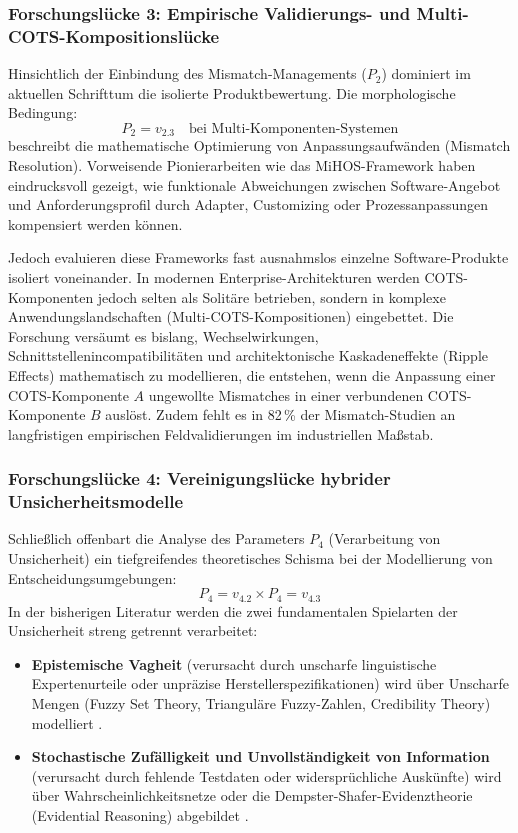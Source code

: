 \subsubsection{Forschungslücke 3: Empirische Validierungs- und Multi-COTS-Kompositionslücke}

Hinsichtlich der Einbindung des Mismatch-Managements ($P_2$) dominiert im aktuellen Schrifttum die isolierte Produktbewertung. Die morphologische Bedingung:
\begin{equation}
P_2 = v_{2.3} \quad \text{bei Multi-Komponenten-Systemen}
\end{equation}
beschreibt die mathematische Optimierung von Anpassungsaufwänden (Mismatch Resolution). Vorweisende Pionierarbeiten wie das MiHOS-Framework \cite{MC9UMXZZ, 9F79VAAB} haben eindrucksvoll gezeigt, wie funktionale Abweichungen zwischen Software-Angebot und Anforderungsprofil durch Adapter, Customizing oder Prozessanpassungen kompensiert werden können. 

Jedoch evaluieren diese Frameworks fast ausnahmslos einzelne Software-Produkte isoliert voneinander. In modernen Enterprise-Architekturen werden COTS-Komponenten jedoch selten als Solitäre betrieben, sondern in komplexe Anwendungslandschaften (Multi-COTS-Kompositionen) eingebettet. Die Forschung versäumt es bislang, Wechselwirkungen, Schnittstellenincompatibilitäten und architektonische Kaskadeneffekte (Ripple Effects) mathematisch zu modellieren, die entstehen, wenn die Anpassung einer COTS-Komponente $A$ ungewollte Mismatches in einer verbundenen COTS-Komponente $B$ auslöst. Zudem fehlt es in 82\,\% der Mismatch-Studien an langfristigen empirischen Feldvalidierungen im industriellen Maßstab.

\subsubsection{Forschungslücke 4: Vereinigungslücke hybrider Unsicherheitsmodelle}

Schließlich offenbart die Analyse des Parameters $P_4$ (Verarbeitung von Unsicherheit) ein tiefgreifendes theoretisches Schisma bei der Modellierung von Entscheidungsumgebungen:
\begin{equation}
P_4 = v_{4.2} \times P_4 = v_{4.3}
\end{equation}
In der bisherigen Literatur werden die zwei fundamentalen Spielarten der Unsicherheit streng getrennt verarbeitet:
\begin{itemize}
    \item \textbf{Epistemische Vagheit} (verursacht durch unscharfe linguistische Expertenurteile oder unpräzise Herstellerspezifikationen) wird über Unscharfe Mengen (Fuzzy Set Theory, Trianguläre Fuzzy-Zahlen, Credibility Theory) modelliert \cite{6YJHIVHG, B7ZTQCZZ}.
    \item \textbf{Stochastische Zufälligkeit und Unvollständigkeit von Information} (verursacht durch fehlende Testdaten oder widersprüchliche Auskünfte) wird über Wahrscheinlichkeitsnetze oder die Dempster-Shafer-Evidenztheorie (Evidential Reasoning) abgebildet \cite{LNQHES84}.
\end{itemize}

